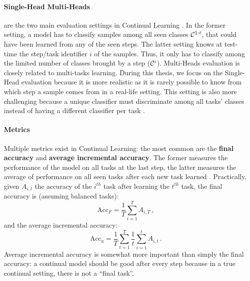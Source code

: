 \paragraph{Single-Head \vs Multi-Heads} are the two main evaluation settings in Continual Learning
\citep{chaudhry2018riemannien_walk}. In the former setting, a model has to classify samples among
all seen classes $\mathcal{C}^{1:t}$, that could have been learned from any of the seen steps. The latter
setting knows at test-time the step/task identifier $i$ of the samples. Thus, it only has to
classify among the limited number of classes brought by a step ($\mathcal{C}^i$). Multi-Heads evaluation is
closely related to multi-tasks learning. During this thesis, we focus on the Single-Head evaluation
because it is more realistic as it is rarely possible to know from which step a sample comes
from in a real-life setting. This setting is also more challenging because a unique classifier must
discriminate among all tasks' classes instead of having a different classifier per task
\citep{lesort2019regulshortcomings}.


\label{sec:related_metrics}

\paragraph{Metrics} Multiple metrics exist in Continual Learning: the most common are the
\textbf{final accuracy} and \textbf{average incremental accuracy}. The former measures the
performance of the model on all tasks at the last step, the latter measures the average of
performance on all seen tasks after each new task learned \citep{rebuffi2017icarl}. Practically,
given $A_{i,t}$ the accuracy of the $i^{th}$ task after learning the $t^{th}$ task, the final
accuracy is (assuming balanced tasks):
%
\begin{equation}
      \text{Acc}_F = \frac{1}{T} \sum_{i=1}^T A_{i,T}\,,
      \label{eq:related_final_acc}
\end{equation}
%
and the average incremental accuracy:
%
\begin{equation}
      \text{Acc}_a = \frac{1}{T} \sum_{t=1}^T \frac{1}{t}  \sum_{i=1}^t A_{i,t}\,.
      \label{eq:related_avg_acc}
\end{equation}
%
Average incremental accuracy is somewhat more important than simply the final accuracy: a continual
model should be good after every step because in a true continual setting, there is not a ``final
task''.

